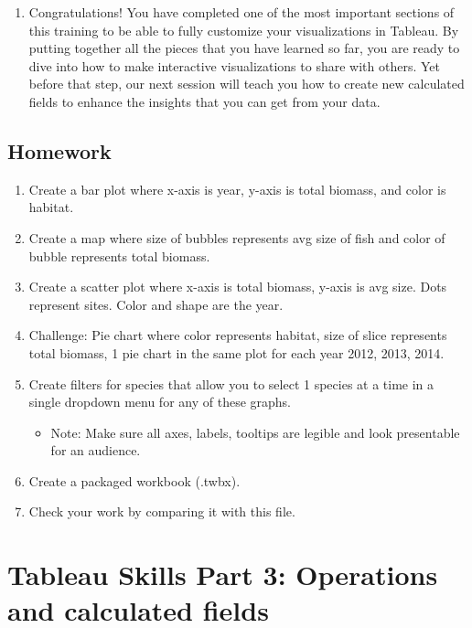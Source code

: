 \documentclass[
]{book}
\providecommand{\tightlist}{%
  \setlength{\itemsep}{0pt}\setlength{\parskip}{0pt}}
\begin{document}
\begin{enumerate}
\def\labelenumi{\arabic{enumi}.}
\tightlist
\item
  Congratulations! You have completed one of the most important sections of this training to be able to fully customize your visualizations in Tableau. By putting together all the pieces that you have learned so far, you are ready to dive into how to make interactive visualizations to share with others. Yet before that step, our next session will teach you how to create new calculated fields to enhance the insights that you can get from your data.
\end{enumerate}

\hypertarget{homework}{%
\subsection{Homework}\label{homework}}

\begin{enumerate}
\def\labelenumi{\arabic{enumi}.}
\tightlist
\item
  Create a bar plot where x-axis is year, y-axis is total biomass, and color is habitat.
\item
  Create a map where size of bubbles represents avg size of fish and color of bubble represents total biomass.
\item
  Create a scatter plot where x-axis is total biomass, y-axis is avg size. Dots represent sites. Color and shape are the year.
\item
  Challenge: Pie chart where color represents habitat, size of slice represents total biomass, 1 pie chart in the same plot for each year 2012, 2013, 2014.
\item
  Create filters for species that allow you to select 1 species at a time in a single dropdown menu for any of these graphs.

  \begin{itemize}
  \tightlist
  \item
    Note: Make sure all axes, labels, tooltips are legible and look presentable for an audience.
  \end{itemize}
\item
  Create a packaged workbook (.twbx).
\item
  Check your work by comparing it with this file.
\end{enumerate}

\hypertarget{tableau-skills-part-3-operations-and-calculated-fields}{%
\section{Tableau Skills Part 3: Operations and calculated fields}\label{tableau-skills-part-3-operations-and-calculated-fields}}
\end{document}
